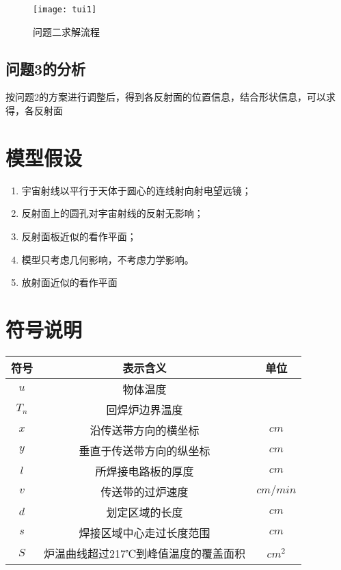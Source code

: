 \documentclass[withoutpreface,bwprint]{cumcmthesis} %
\numberwithin{equation}{subsection}
\begin{document}
\begin{figure}[!h]
	\centering
	\texttt{[image: tui1]}
	\caption{问题二求解流程}
	\label{fig:1}
\end{figure}

\subsection{问题3的分析}
按问题2的方案进行调整后，得到各反射面的位置信息，结合形状信息，可以求得，各反射面

\section{模型假设}

\begin{enumerate}[label=(\arabic*)]
\item 宇宙射线以平行于天体于圆心的连线射向射电望远镜；
\item 反射面上的圆孔对宇宙射线的反射无影响；
\item 反射面板近似的看作平面；
\item 模型只考虑几何影响，不考虑力学影响。
\item 放射面近似的看作平面

	
\end{enumerate}






\section{符号说明}


\begin{table}[h]
	\centering
	\begin{tabular}{ccc}
		\toprule[1.5pt]
		符号   &    表示含义 &   单位  \\
		\midrule[1pt]
		$u$ & 物体温度 & \textcelsius  \\
		$T_{n}$ & 回焊炉边界温度 & \textcelsius \\
		$x$& 沿传送带方向的横坐标 &  $cm$ \\
		$y$& 垂直于传送带方向的纵坐标 &  $cm$   \\
		$l$& 所焊接电路板的厚度 &   $cm$  \\
		$v$& 传送带的过炉速度 &   $cm/min$  \\
		$d$& 划定区域的长度 &    $cm$ \\
		$s$& 焊接区域中心走过长度范围 &   $cm$  \\
		$S$& 炉温曲线超过217℃到峰值温度的覆盖面积 &   $cm^2$  \\
		\bottomrule[1.5pt]
		
	\end{tabular}
\end{table}
\end{document}
